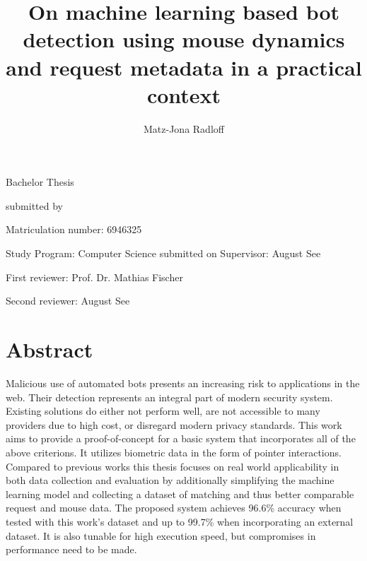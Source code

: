 \documentclass[
    fontsize=12pt,
    headings=small,
    parskip=half,           %
    bibliography=totoc,
    numbers=noenddot,       %
    open=any,               %
    final,                   %
    table
]{scrreprt}
\begin{document}
\title{On machine learning based bot detection using mouse dynamics and request metadata in a practical context}
\author{Matz-Jona Radloff}


\begin{titlepage}
\begin{center}\Large
    \vfill
    Bachelor Thesis
    \vfill
    \makeatletter
    {\Large\textsf{\textbf{\@title}}\par}
    \makeatother
    \vfill
    submitted by
    \par\bigskip
    \makeatletter
    {\@author} \par
    \makeatother
    Matriculation number: 6946325 \par
    Study Program: Computer Science
    \vfill
    \makeatletter
    submitted on {\@date}
    \makeatother
    \vfill
    Supervisor: August See\par
    First reviewer: Prof. Dr. Mathias Fischer \par
    Second reviewer: August See
\end{center}
\end{titlepage}


\chapter*{Abstract}

Malicious use of automated bots presents an increasing risk to applications in the web. Their detection represents an integral part of modern security system. Existing solutions do either not perform well, are not accessible to many providers due to high cost, or disregard modern privacy standards. This work aims to provide a proof-of-concept for a basic system that incorporates all of the above criterions. It utilizes biometric data in the form of pointer interactions. Compared to previous works this thesis focuses on real world applicability in both data collection and evaluation by additionally simplifying the machine learning model and collecting a dataset of matching and thus better comparable request and mouse data. The proposed system achieves 96.6\% accuracy when tested with this work's dataset and up to 99.7\% when incorporating an external dataset. It is also tunable for high execution speed, but compromises in performance need to be made.
\end{document}
